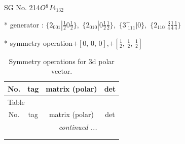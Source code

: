\documentclass[fleqn,8pt]{jsarticle}
\begin{document}
\setcounter{MaxMatrixCols}{32}

\renewcommand{\tablename}{Table~}
\renewcommand{\figurename}{Figure~}
\begin{center}
\LARGE
SG No. 214\quad$O_{\rm }^{8}$\quad$I4_132$\quad[ cubic ]
\end{center}

* generator : $\{2{}_{001}|\frac{1}{2} 0 \frac{1}{2}\},\,\,\{2{}_{010}|0 \frac{1}{2} \frac{1}{2}\},\,\,\{3^{+}_{\,\,111}|0\},\,\,\{2{}_{110}|\frac{3}{4} \frac{1}{4} \frac{1}{4}\}$

* symmetry operation\quad$+\left[ 0,\, 0,\, 0 \right]$,\quad $+\left[ \frac{1}{2},\, \frac{1}{2},\, \frac{1}{2} \right]$
\renewcommand{\arraystretch}{1.3}
\begin{longtable}{cccc}
\caption{Symmetry operations for 3d polar vector.}
 \\
 \hline \hline
No. & tag & matrix (polar) & det \\ \hline \endfirsthead

\multicolumn{3}{l}{\tablename\ \thetable{}} \\
 \hline \hline
No. & tag & matrix (polar) & det \\ \hline \endhead

 \hline \hline
\multicolumn{3}{r}{\footnotesize\it continued ...} \\ \endfoot

 \hline \hline
\multicolumn{3}{r}{} \\ \endlastfoot


\end{longtable}
\end{document}
